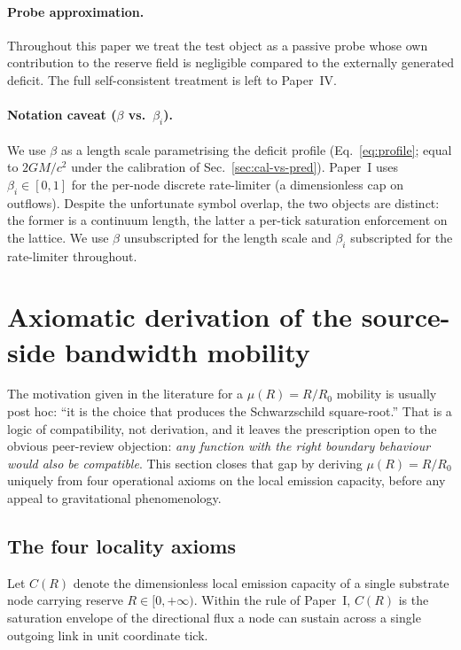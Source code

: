 \documentclass[11pt,a4paper]{article}
\begin{document}
\paragraph{Probe approximation.} Throughout this paper we
treat the test object as a passive probe whose own
contribution to the reserve field is negligible compared to
the externally generated deficit. The full self-consistent
treatment is left to Paper~IV.

\paragraph{Notation caveat ($\beta$ vs.\ $\beta_i$).}
We use $\beta$ as a length scale parametrising the deficit
profile (Eq.~\eqref{eq:profile}; equal to $2GM/c^2$ under the
calibration of Sec.~\ref{sec:cal-vs-pred}). Paper~I uses
$\beta_i \in [0,1]$ for the per-node discrete rate-limiter (a
dimensionless cap on outflows). Despite the unfortunate symbol
overlap, the two objects are distinct: the former is a
continuum length, the latter a per-tick saturation enforcement
on the lattice. We use $\beta$ unsubscripted for the length
scale and $\beta_i$ subscripted for the rate-limiter
throughout.

\section{Axiomatic derivation of the source-side bandwidth mobility}
\label{sec:axiomatic-derivation}

The motivation given in the literature for a $\mu(R) = R/R_0$
mobility is usually post hoc: ``it is the choice that produces
the Schwarzschild square-root.'' That is a logic of compatibility,
not derivation, and it leaves the prescription open to the obvious
peer-review objection: \emph{any function with the right
boundary behaviour would also be compatible}. This section closes
that gap by deriving $\mu(R) = R/R_0$ uniquely from four
operational axioms on the local emission capacity, before any
appeal to gravitational phenomenology.

\subsection{The four locality axioms}

Let $C(R)$ denote the dimensionless local emission capacity of a
single substrate node carrying reserve $R \in [0, +\infty)$.
Within the rule of Paper~I, $C(R)$ is the saturation envelope of
the directional flux a node can sustain across a single outgoing
link in unit coordinate tick.
\end{document}

